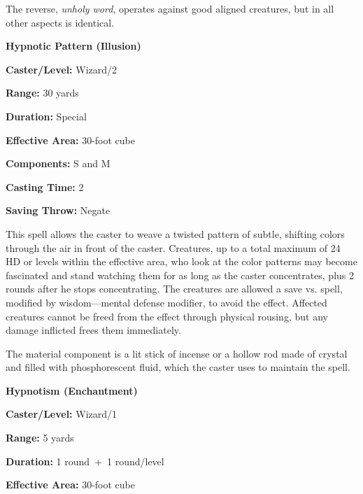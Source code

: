 \begin{multicols}{2}
The reverse, \textit{unholy word}, operates against good aligned creatures, but in all other aspects is identical.

\vspace{1em}

\noindent
\begin{minipage}{\columnwidth}

\noindent \textbf{Hypnotic Pattern (Illusion)}

\noindent \textbf{Caster/Level:} Wizard/2

\noindent \textbf{Range:} 30 yards

\noindent \textbf{Duration:} Special

\noindent \textbf{Effective Area:} 30-foot cube

\noindent \textbf{Components:} S and M

\noindent \textbf{Casting Time:} 2

\noindent \textbf{Saving Throw:} Negate

\end{minipage}

This spell allows the caster to weave a twisted pattern of subtle, shifting colors through the air in front of the caster.  Creatures, up to a total maximum of 24 HD or levels within the effective area, who look at the color patterns may become fascinated and stand watching them for as long as the caster concentrates, plus 2 rounds after he stops concentrating.  The creatures are allowed a save vs. spell, modified by wisdom---mental defense modifier, to avoid the effect.  Affected creatures cannot be freed from the effect through physical rousing, but any damage inflicted frees them immediately.

The material component is a lit stick of incense or a hollow rod made of crystal and filled with phosphorescent fluid, which the caster uses to maintain the spell.

\vspace{1em}

\noindent
\begin{minipage}{\columnwidth}

\noindent \textbf{Hypnotism (Enchantment)}

\noindent \textbf{Caster/Level:} Wizard/1

\noindent \textbf{Range:} 5 yards

\noindent \textbf{Duration:} 1 round~+~1 round/level

\noindent \textbf{Effective Area:} 30-foot cube


\end{minipage}
\end{multicols}
